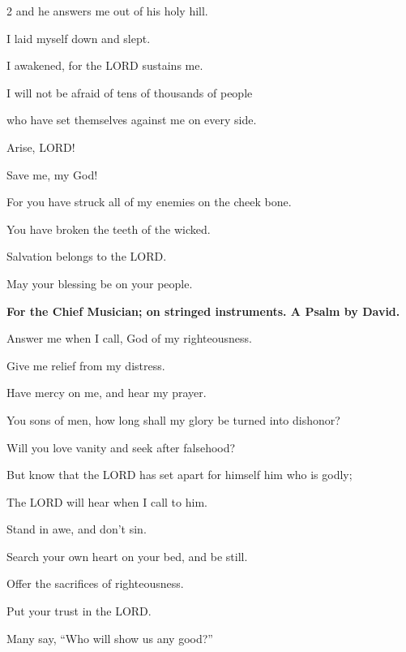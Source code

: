 \begin{multicols}{2}
	and he answers me out of his holy hill.
	
	\vspace{\baselineskip}
	
	
	\myverse{}I laid myself down and slept.
	
	I awakened, for the LORD sustains me.
	
	
	\myverse{}I will not be afraid of tens of thousands of people
	
	who have set themselves against me on every side.
	
	
	\myverse{}Arise, LORD!
	
	Save me, my God!
	
	For you have struck all of my enemies on the cheek bone.
	
	You have broken the teeth of the wicked.
	
	
	\myverse{}Salvation belongs to the LORD.
	
	May your blessing be on your people.
	
	
	
	\mychapter{}\textbf{For the Chief Musician; on stringed instruments. A Psalm by David.}
	
	\myverse*{}Answer me when I call, God of my righteousness.
	
	Give me relief from my distress.
	
	Have mercy on me, and hear my prayer.
	
	
	\myverse{}You sons of men, how long shall my glory be turned into dishonor?
	
	Will you love vanity and seek after falsehood?
	
	\vspace{\baselineskip}
	
	
	\myverse{}But know that the LORD has set apart for himself him who is godly;
	
	The LORD will hear when I call to him.
	
	
	\myverse{}Stand in awe, and don’t sin.
	
	Search your own heart on your bed, and be still.
	
	\vspace{\baselineskip}
	
	
	\myverse{}Offer the sacrifices of righteousness.
	
	Put your trust in the LORD.
	
	
	\myverse{}Many say, “Who will show us any good?”
	

\end{multicols}
